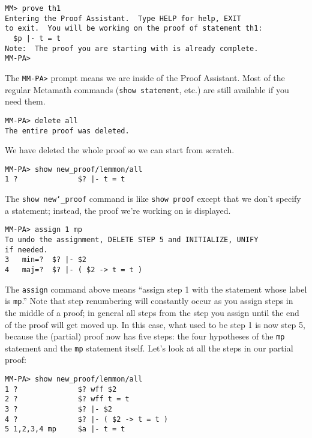 \begin{verbatim}
MM> prove th1
Entering the Proof Assistant.  Type HELP for help, EXIT
to exit.  You will be working on the proof of statement th1:
  $p |- t = t
Note:  The proof you are starting with is already complete.
MM-PA>
\end{verbatim}

The \verb/MM-PA>/ prompt means we are inside of the Proof
Assistant. Most of the regular Metamath commands
(\texttt{show statement}, etc.) are still available if you need them.

\begin{verbatim}
MM-PA> delete all
The entire proof was deleted.
\end{verbatim}

We have deleted the whole proof so we can start from scratch.

\begin{verbatim}
MM-PA> show new_proof/lemmon/all
1 ?              $? |- t = t
\end{verbatim}

The \texttt{show new{\char`\_}proof} command is like \texttt{show proof} except that we
don't specify a statement; instead, the proof we're working on is
displayed.

\begin{verbatim}
MM-PA> assign 1 mp
To undo the assignment, DELETE STEP 5 and INITIALIZE, UNIFY
if needed.
3   min=?  $? |- $2
4   maj=?  $? |- ( $2 -> t = t )
\end{verbatim}

The \texttt{assign} command above means
``assign step 1 with the statement whose label is \texttt{mp}.''  Note
that step renumbering will constantly occur as you assign steps in the
middle of a proof; in general all steps from the step you assign until
the end of the proof will get moved up.  In this case, what used to be
step 1 is now step 5, because the (partial) proof now has five steps:
the four hypotheses of the \texttt{mp} statement and the \texttt{mp}
statement itself.  Let's look at all the steps in our partial proof:

\begin{verbatim}
MM-PA> show new_proof/lemmon/all
1 ?              $? wff $2
2 ?              $? wff t = t
3 ?              $? |- $2
4 ?              $? |- ( $2 -> t = t )
5 1,2,3,4 mp     $a |- t = t
\end{verbatim}

